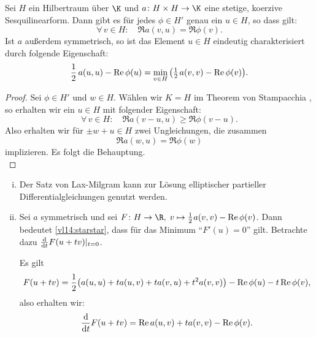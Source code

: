 \pagebreak[2]
\begin{thSatz} \label{vl14:laxmilgram}
    Sei $H$ ein Hilbertraum über $\K$ und $a\colon H\times H\to\K$ eine stetige,
    koerzive Sesquilinearform. Dann gibt es für jedes $\phi\in H'$ genau ein
    $u\in H$, so dass gilt:
    \[ \tag{$\star\star$} \label{vl14:starstar}
        \forall\,v\in H\colon\quad \Re a(v,u) = \Re\phi(v)  
    . \]
    Ist $a$ außerdem symmetrisch, so ist das Element $u\in H$ eindeutig
    charakterisiert durch folgende Eigenschaft:
    \[ \frac{1}{2}\,a(u,u) - \operatorname{Re}\phi(u) 
        = \min_{v\in H} \, \bigl( \tfrac{1}{2}\mkern2mu a(v,v) - \operatorname{Re}\phi(v) \bigr)
    . \]
\end{thSatz}

\begin{proof}
    Sei $\phi\in H'$ und $w\in H$. Wählen wir $K=H$ im Theorem von
    Stampacchia , so erhalten wir ein $u\in H$ mit
    folgender Eigenschaft:
    \[ \forall\,v\in H\colon\quad \Re a(v-u,u) \geq \Re\phi(v-u)  . \]
    Also erhalten wir für $\pm w+u\in H$ zwei Ungleichungen, die zusammen
    \[ \Re a(w,u) = \Re \phi(w)  \]
    implizieren. Es folgt die Behauptung.
    \\
\end{proof}

\begin{thBemerkung}\hfill
    \begin{enumerate}[(i)]
        \item 
            Der Satz von Lax-Milgram  kann zur Lösung
            elliptischer partieller Differentialgleichungen genutzt werden.
            
        \item
            Sei $a$ symmetrisch und sei $F\colon H\to\R,\; v\mapsto 
            \half\mkern1mu a(v,v) - \Re\phi(v)$. Dann bedeutet \eqref{vl14:starstar},
            dass für das Minimum \enquote{$F'(u)=0$} gilt. Betrachte dazu
            $\frac{\mathrm d}{\mathrm dt}  F(u+tv)\vert_{t=0}$.
            
            Es gilt
            \[ F(u+tv) = \frac{1}{2} \bigl( a(u,u)+ t a(u,v) + t a(v,u) + t^2 a(v,v)
                \bigr) - \operatorname{Re}\phi(u) - t \operatorname{Re}\phi(v)
            , \]
            also erhalten wir:
            \[ \frac{\mathrm d}{\mathrm dt} F(u+t v) = \operatorname{Re} a(u,v) + t a(v,v) - \operatorname{Re}\phi(v)  . \]
    \end{enumerate}
\end{thBemerkung}

